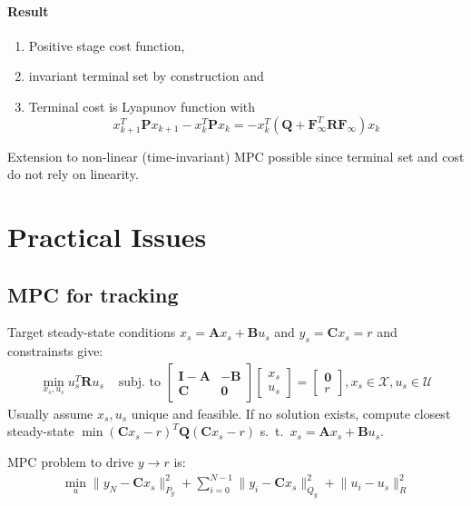 \documentclass[landscape,a4paper,8pt]{scrartcl}
\renewcommand{\implies}{\Rightarrow}
\newcommand{\mc}[1]{\mathcal{#1}}
\newcommand\vA{\bm{A}}
\newcommand\vB{\bm{B}}
\newcommand\vC{\bm{C}}
\newcommand\vF{\bm{F}}
\newcommand\vI{\bm{I}}
\newcommand\vP{\bm{P}}
\newcommand\vQ{\bm{Q}}
\newcommand\vR{\bm{R}}
\newcommand{\Me}[1]{\begin{bmatrix}#1\end{bmatrix}} %
\begin{document}
\begin{multicols*}{3}
\paragraph{Result}
\begin{enumerate}
\item Positive stage cost function,
\item invariant terminal set by construction and
\item Terminal cost is Lyapunov function with
\[ x_{k+1}^T\vP x_{k+1} - x_k^T\vP x_k = -x_k^T(\vQ + \vF_\infty^T\vR\vF_\infty)x_k \]
\end{enumerate}

Extension to non-linear (time-invariant) MPC possible since terminal set and cost do not rely on linearity.

\section{Practical Issues}

\subsection{MPC for tracking}
Target steady-state conditions $x_s = \vA x_s + \vB u_s$ and $y_s = \vC x_s = r$ and constrainsts give:
\begin{align*}
\min_{x_s, u_s} u_s^T \vR u_s & \text{ subj. to } \Me{\vI-\vA & -\vB \\ \vC & \bm 0}\Me{x_s \\ u_s} = \Me{\bm 0 \\ r}, x_s \in \mc X, u_s \in \mc U
\end{align*}
Usually assume $x_s, u_s$ unique and feasible.
If no solution exists, compute closest steady-state $\min (\vC x_s - r)^T \vQ (\vC x_s - r)$ s.\ t.\ $x_s = \vA x_s + \vB u_s$.



MPC problem to drive $y \rightarrow r$ is:
\begin{align*}
\min_u \lVert y_N - \vC x_s \rVert_{P_y}^2 + \sum_{i=0}^{N-1}\lVert y_i - \vC x_s \rVert_{Q_y}^2 + \lVert u_i - u_s \rVert_R^2
\end{align*}


\end{multicols*}
\end{document}
